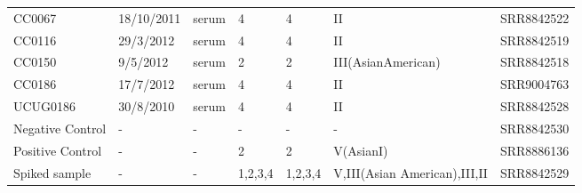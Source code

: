 \begin{table}[h!]
{\begin{tabular}{@{}lllllll@{}}
CC0067           & 18/10/2011 & serum  & 4 & 4 & II                 & SRR8842522 \\
CC0116           & 29/3/2012  & serum  & 4 & 4 & II                 & SRR8842519 \\
CC0150           & 9/5/2012   & serum  & 2 & 2 & III(AsianAmerican) & SRR8842518 \\
CC0186           & 17/7/2012  & serum  & 4 & 4 & II                 & SRR9004763 \\
UCUG0186         & 30/8/2010  & serum  & 4 & 4 & II                 & SRR8842528 \\
Negative Control & -          & -      & - & - & -                  & SRR8842530 \\
Positive Control & -          & -      & 2 & 2 & V(AsianI)          & SRR8886136 \\
Spiked   sample & -                          & -               & 1,2,3,4                    & 1,2,3,4           & V,III(Asian American),III,II & SRR8842529             \\ \bottomrule
\end{tabular}%
}
\end{table}
